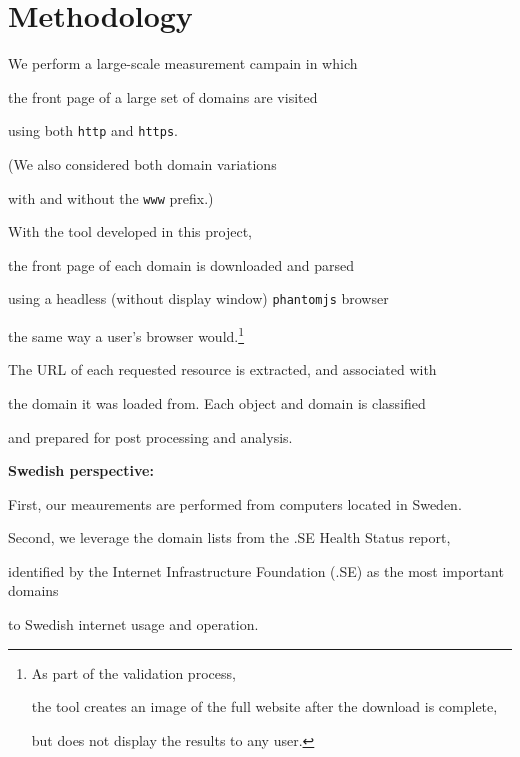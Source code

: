 \documentclass{sig-alternate-10pt}
\begin{document}
\section{Methodology}\label{sec:method}




We perform a large-scale measurement campain in which 

the front page of a large set of domains are visited

using both \texttt{http} and \texttt{https}.

(We also considered both domain variations 

with and without the \texttt{www} prefix.)



With the tool developed in this project,



the front page of each domain is downloaded and parsed 

using a headless (without display window) \texttt{phantomjs} browser 

the same way a user's browser would.\footnote{

As part of the validation process,

the tool creates an image of the full website after the download is complete,

but does not display the results to any user.}

The URL of each requested resource is extracted, and associated with

the domain it was loaded from. Each object and domain is classified 

and prepared for post processing and analysis.



{\bf Swedish perspective:}  

First, our meaurements are performed from computers located in Sweden.

Second, we leverage the domain lists from the .SE Health Status report\cite{},

identified by the Internet Infrastructure Foundation (.SE) as the most important domains

to Swedish internet usage and operation.
\end{document}
